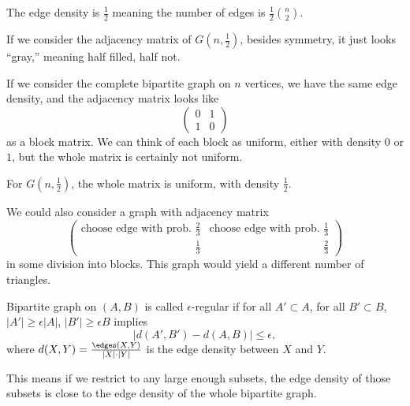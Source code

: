 The edge density is $\frac{1}{2}$ meaning the number of edges is $\frac{1}{2}{n\choose 2}$.

If we consider the adjacency matrix of $G(n,\frac{1}{2})$, besides symmetry, it just looks ``gray,'' meaning half filled, half not.

If we consider the complete bipartite graph on $n$ vertices, we have the same edge density, and the adjacency matrix looks like
\[
\begin{pmatrix}
0 & 1 \\
1 & 0
\end{pmatrix}
\]
as a block matrix. We can think of each block as uniform, either with density $0$ or $1$, but the whole matrix is certainly not uniform.

 For $G(n,\frac{1}{2})$, the whole matrix is uniform, with density $\frac{1}{2}$.

We could also consider a graph with adjacency matrix
\[
\begin{pmatrix}
\text{choose edge with prob. }\frac{2}{3} &\text{choose edge with prob. } \frac{1}{3}\\
\phantom{\text{choose edge with prob. }}\frac{1}{3} & \phantom{\text{choose edge with prob. }}\frac{2}{3}
\end{pmatrix}
\]
in some division into blocks. This graph would yield a different number of triangles.
\begin{definition}
Bipartite graph on $(A,B)$ is called $\epsilon$-regular if for all $A'\subset A$, for all $B'\subset B$, $|A'|\geq \epsilon |A|$, $|B'|\geq \epsilon B$ implies
\[
|d(A',B') - d(A,B)| \leq \epsilon,
\]
where $d(X,Y) = \frac{\edges (X,Y)}{|X|\cdot |Y|} $ is the edge density between $X$ and $Y$.
\end{definition}
\begin{remark}
This means if we restrict to any large enough subsets, the edge density of those subsets is close to the edge density of the whole bipartite graph.
\end{remark}

